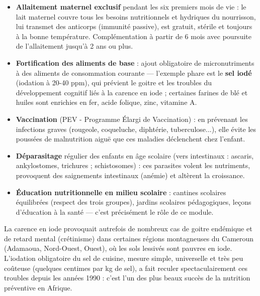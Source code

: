 \documentclass[11pt]{article}
\newcounter{popsec}
\newcounter{popsub}
\newcommand{\courssub}[1]{%
  \stepcounter{popsub}%
  \par\vspace{9pt}\noindent{\popxbold\fontsize{11.5}{13}\selectfont\color{popink}{\color{poporange}\thepopsec.\thepopsub}\hspace{6pt}#1}\par\nopagebreak\vspace{4pt}
}
\begin{document}
\begin{itemize}
\item \textbf{Allaitement maternel exclusif} pendant les six premiers mois de vie : le lait maternel couvre tous les besoins nutritionnels et hydriques du nourrisson, lui transmet des anticorps (immunité passive), est gratuit, stérile et toujours à la bonne température. Complémentation à partir de 6 mois avec poursuite de l'allaitement jusqu'à 2 ans ou plus.
\item \textbf{Fortification des aliments de base} : ajout obligatoire de micronutriments à des aliments de consommation courante — l'exemple phare est le \textbf{sel iodé} (iodation à 20-40 ppm), qui prévient le goitre et les troubles du développement cognitif liés à la carence en iode ; certaines farines de blé et huiles sont enrichies en fer, acide folique, zinc, vitamine A.
\item \textbf{Vaccination} (PEV - Programme Élargi de Vaccination) : en prévenant les infections graves (rougeole, coqueluche, diphtérie, tuberculose...), elle évite les poussées de malnutrition aiguë que ces maladies déclenchent chez l'enfant.
\item \textbf{Déparasitage} régulier des enfants en âge scolaire (vers intestinaux : ascaris, ankylostomes, trichures ; schistosomes) : ces parasites volent les nutriments, provoquent des saignements intestinaux (anémie) et altèrent la croissance.
\item \textbf{Éducation nutritionnelle en milieu scolaire} : cantines scolaires équilibrées (respect des trois groupes), jardins scolaires pédagogiques, leçons d'éducation à la santé — c'est précisément le rôle de ce module.
\end{itemize}

\begin{savaistu}
La carence en iode provoquait autrefois de nombreux cas de goitre endémique et de retard mental (crétinisme) dans certaines régions montagneuses du Cameroun (Adamaoua, Nord-Ouest, Ouest), où les sols lessivés sont pauvres en iode. L'iodation obligatoire du sel de cuisine, mesure simple, universelle et très peu coûteuse (quelques centimes par kg de sel), a fait reculer spectaculairement ces troubles depuis les années 1990 : c'est l'un des plus beaux succès de la nutrition préventive en Afrique.
\end{savaistu}

\courssub{Conduite à tenir devant un cas suspect}
\end{document}
